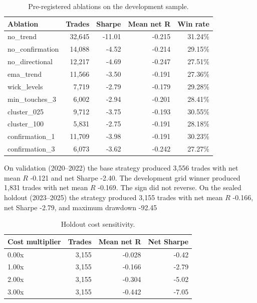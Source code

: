 \documentclass[11pt,a4paper]{article}
\begin{document}
\begin{table}[htbp]
\centering
\small
\setlength{\tabcolsep}{4pt}
\caption{Pre-registered ablations on the development sample.}
\label{tab:ablations}
\begin{tabular}{lrrrr}
\toprule
Ablation & Trades & Sharpe & Mean net R & Win rate \\
\midrule
no\_trend & 32,645 & -11.01 & -0.215 & 31.24\% \\
no\_confirmation & 14,088 & -4.52 & -0.214 & 29.15\% \\
no\_directional & 12,217 & -4.69 & -0.247 & 27.51\% \\
ema\_trend & 11,566 & -3.50 & -0.191 & 27.36\% \\
wick\_levels & 7,719 & -2.79 & -0.179 & 29.28\% \\
min\_touches\_3 & 6,002 & -2.94 & -0.201 & 28.41\% \\
cluster\_025 & 9,712 & -3.75 & -0.193 & 30.55\% \\
cluster\_100 & 5,831 & -2.75 & -0.191 & 28.18\% \\
confirmation\_1 & 11,709 & -3.98 & -0.191 & 30.23\% \\
confirmation\_3 & 6,073 & -3.62 & -0.242 & 27.27\% \\
\bottomrule
\end{tabular}
\end{table}
On validation (2020--2022) the base strategy produced 3,556 trades with net mean $R$ -0.121 and net Sharpe -2.40. The development grid winner produced 1,831 trades with net mean $R$ -0.169. The sign did not reverse.
On the sealed holdout (2023--2025) the strategy produced 3,155 trades with net mean $R$ -0.166, net Sharpe -2.79, and maximum drawdown -92.45%
\begin{table}[htbp]
\centering
\small
\setlength{\tabcolsep}{4pt}
\caption{Holdout cost sensitivity.}
\label{tab:costs}
\begin{tabular}{lrrr}
\toprule
Cost multiplier & Trades & Mean net R & Net Sharpe \\
\midrule
0.00x & 3,155 & -0.028 & -0.42 \\
1.00x & 3,155 & -0.166 & -2.79 \\
2.00x & 3,155 & -0.304 & -5.02 \\
3.00x & 3,155 & -0.442 & -7.05 \\
\bottomrule
\end{tabular}
\end{table}
\end{document}
